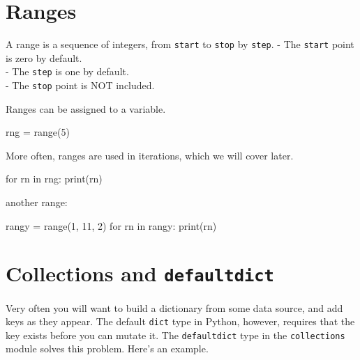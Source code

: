 \documentclass[
  letterpaper,
  DIV=11,
  numbers=noendperiod]{scrreprt}
\newenvironment{Shaded}{\begin{snugshade}}{\end{snugshade}}
\newcommand{\BuiltInTok}[1]{\textcolor[rgb]{0.00,0.23,0.31}{#1}}
\newcommand{\ControlFlowTok}[1]{\textcolor[rgb]{0.00,0.23,0.31}{#1}}
\newcommand{\DecValTok}[1]{\textcolor[rgb]{0.68,0.00,0.00}{#1}}
\newcommand{\KeywordTok}[1]{\textcolor[rgb]{0.00,0.23,0.31}{#1}}
\newcommand{\NormalTok}[1]{\textcolor[rgb]{0.00,0.23,0.31}{#1}}
\newcommand{\OperatorTok}[1]{\textcolor[rgb]{0.37,0.37,0.37}{#1}}
\begin{document}
\hypertarget{ranges-1}{%
\chapter{Ranges}\label{ranges-1}}

A range is a sequence of integers, from \texttt{start} to \texttt{stop}
by \texttt{step}. - The \texttt{start} point is zero by default.\\
- The \texttt{step} is one by default.\\
- The \texttt{stop} point is NOT included.

Ranges can be assigned to a variable.

\begin{Shaded}
\begin{Highlighting}[]
\NormalTok{rng }\OperatorTok{=} \BuiltInTok{range}\NormalTok{(}\DecValTok{5}\NormalTok{)}
\end{Highlighting}
\end{Shaded}

More often, ranges are used in iterations, which we will cover later.

\begin{Shaded}
\begin{Highlighting}[]
\ControlFlowTok{for}\NormalTok{ rn }\KeywordTok{in}\NormalTok{ rng:}
    \BuiltInTok{print}\NormalTok{(rn)}
\end{Highlighting}
\end{Shaded}

another range:

\begin{Shaded}
\begin{Highlighting}[]
\NormalTok{rangy }\OperatorTok{=} \BuiltInTok{range}\NormalTok{(}\DecValTok{1}\NormalTok{, }\DecValTok{11}\NormalTok{, }\DecValTok{2}\NormalTok{)}
\ControlFlowTok{for}\NormalTok{ rn }\KeywordTok{in}\NormalTok{ rangy:}
    \BuiltInTok{print}\NormalTok{(rn)}
\end{Highlighting}
\end{Shaded}

\hypertarget{collections-and-defaultdict-1}{%
\chapter{\texorpdfstring{Collections and
\texttt{defaultdict}}{Collections and defaultdict}}\label{collections-and-defaultdict-1}}

Very often you will want to build a dictionary from some data source,
and add keys as they appear. The default \texttt{dict} type in Python,
however, requires that the key exists before you can mutate it. The
\texttt{defaultdict} type in the \texttt{collections} module solves this
problem. Here's an example.
\end{document}
